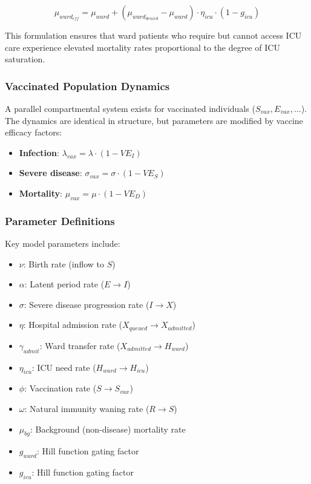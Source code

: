 \documentclass[10pt,twocolumn]{article}
\begin{document}
\begin{equation*}
\mu_{ward_{eff}} = \mu_{ward} + (\mu_{ward_{denied}} - \mu_{ward}) \cdot \eta_{icu} \cdot (1 - g_{icu})
\end{equation*}

This formulation ensures that ward patients who require but cannot access ICU care experience elevated mortality rates proportional to the degree of ICU saturation.

\subsubsection{Vaccinated Population Dynamics}

A parallel compartmental system exists for vaccinated individuals ($S_{vax}, E_{vax}, \ldots$). The dynamics are identical in structure, but parameters are modified by vaccine efficacy factors:

\begin{itemize}
\item \textbf{Infection}: $\lambda_{vax} = \lambda \cdot (1 - VE_I)$
\item \textbf{Severe disease}: $\sigma_{vax} = \sigma \cdot (1 - VE_S)$
\item \textbf{Mortality}: $\mu_{vax} = \mu \cdot (1 - VE_D)$
\end{itemize}

\subsubsection{Parameter Definitions}

Key model parameters include:
\begin{itemize}
\item $\nu$: Birth rate (inflow to $S$)
\item $\alpha$: Latent period rate ($E \to I$)
\item $\sigma$: Severe disease progression rate ($I \to X$)
\item $\eta$: Hospital admission rate ($X_{queued} \to X_{admitted}$)
\item $\gamma_{admit}$: Ward transfer rate ($X_{admitted} \to H_{ward}$)
\item $\eta_{icu}$: ICU need rate ($H_{ward} \to H_{icu}$)
\item $\phi$: Vaccination rate ($S \to S_{vax}$)
\item $\omega$: Natural immunity waning rate ($R \to S$)
\item $\mu_{bg}$: Background (non-disease) mortality rate
\item $g_{ward}$: Hill function gating factor
\item $g_{icu}$: Hill function gating factor
\end{itemize}
\end{document}
